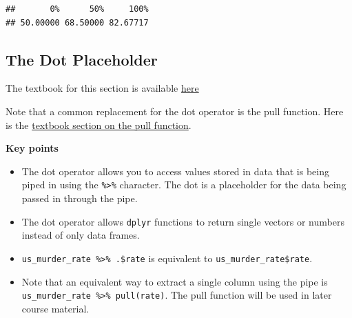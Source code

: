 \documentclass[
]{article}
\newenvironment{Shaded}{\begin{snugshade}}{\end{snugshade}}
\newcommand{\CommentTok}[1]{\textcolor[rgb]{0.56,0.35,0.01}{\textit{#1}}}
\newcommand{\DataTypeTok}[1]{\textcolor[rgb]{0.13,0.29,0.53}{#1}}
\newcommand{\DecValTok}[1]{\textcolor[rgb]{0.00,0.00,0.81}{#1}}
\newcommand{\FloatTok}[1]{\textcolor[rgb]{0.00,0.00,0.81}{#1}}
\newcommand{\KeywordTok}[1]{\textcolor[rgb]{0.13,0.29,0.53}{\textbf{#1}}}
\newcommand{\NormalTok}[1]{#1}
\newcommand{\OperatorTok}[1]{\textcolor[rgb]{0.81,0.36,0.00}{\textbf{#1}}}
\newcommand{\StringTok}[1]{\textcolor[rgb]{0.31,0.60,0.02}{#1}}
\providecommand{\tightlist}{%
  \setlength{\itemsep}{0pt}\setlength{\parskip}{0pt}}
\begin{document}
\begin{verbatim}
##       0%      50%     100% 
## 50.00000 68.50000 82.67717
\end{verbatim}

\begin{Shaded}
\end{Shaded}

\hypertarget{the-dot-placeholder}{%
\subsection{The Dot Placeholder}\label{the-dot-placeholder}}

The textbook for this section is available
\href{https://rafalab.github.io/dsbook/tidyverse.html\#the-dot-operator}{here}

Note that a common replacement for the dot operator is the pull
function. Here is the
\href{https://rafalab.github.io/dsbook/tidyverse.html\#pull}{textbook
section on the pull function}.

\textbf{Key points}

\begin{itemize}
\tightlist
\item
  The dot operator allows you to access values stored in data that is
  being piped in using the \texttt{\%\textgreater{}\%} character. The
  dot is a placeholder for the data being passed in through the pipe.
\item
  The dot operator allows \texttt{dplyr} functions to return single
  vectors or numbers instead of only data frames.
\item
  \texttt{us\_murder\_rate\ \%\textgreater{}\%\ .\$rate} is equivalent
  to \texttt{us\_murder\_rate\$rate}.
\item
  Note that an equivalent way to extract a single column using the pipe
  is \texttt{us\_murder\_rate\ \%\textgreater{}\%\ pull(rate)}. The pull
  function will be used in later course material.
\end{itemize}
\end{document}
